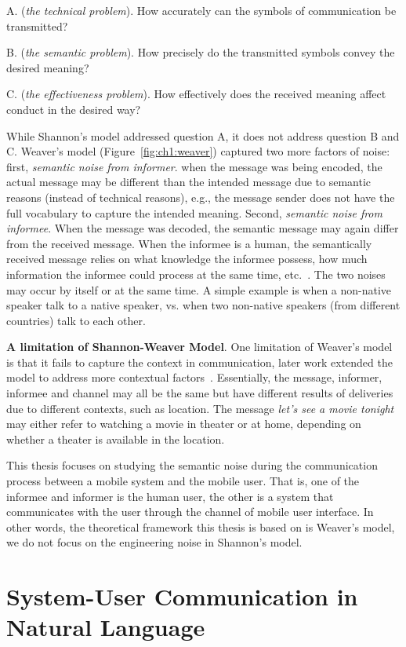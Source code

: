 A. (\textit{the technical problem}). How accurately can the symbols of communication be transmitted?

B. (\textit{the semantic problem}). How precisely do the transmitted symbols convey the desired meaning?

C. (\textit{the effectiveness problem}). How effectively does the received meaning affect conduct in the desired way?

While Shannon's model addressed question A, it does not address question B and C. Weaver's model (Figure~\ref{fig:ch1:weaver}) captured two more factors of noise: first, \textit{semantic noise from informer}. when the message was being encoded, the actual message may be different than the intended message due to semantic reasons (instead of technical reasons), e.g., the message sender does not have the full vocabulary to capture the intended meaning. Second, \textit{semantic noise from informee}. When the message was decoded, the semantic message may again differ from the received message. When the informee is a human, the semantically received message relies on what knowledge the informee possess, how much information the informee could process at the same time, etc.~\cite{weavernote}. The two noises may occur by itself or at the same time. A simple example is when a non-native speaker talk to a native speaker, vs. when two non-native speakers (from different countries) talk to each other. 

\textbf{A limitation of Shannon-Weaver Model}. One limitation of Weaver's model is that it fails to capture the context in communication, later work extended the model to address more contextual factors~\cite{chandler1994transmission}. Essentially, the message, informer, informee and channel may all be the same but have different results of deliveries due to different contexts, such as location. The message \textit{let's see a movie tonight} may either refer to watching a movie in theater or at home, depending on whether a theater is available in the location. 

This thesis focuses on studying the semantic noise during the communication process between a mobile system and the mobile user. That is, one of the informee and informer is the human user, the other is a system that communicates with the user through the channel of mobile user interface. In other words, the theoretical framework this thesis is based on is Weaver's model, we do not focus on the engineering noise in Shannon's model. 

\section{System-User Communication in Natural Language}

